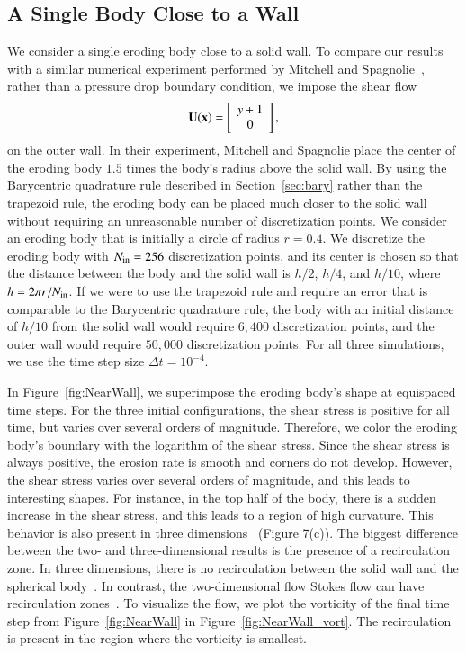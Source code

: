 \documentclass[preprint, 10pt]{elsarticle}
\begin{document}
\subsection{A Single Body Close to a Wall}
We consider a single eroding body close to a solid wall.  To compare our
results with a similar numerical experiment performed by Mitchell and
Spagnolie~\cite{mit-spa2017}, rather than a pressure drop boundary
condition, we impose the shear flow
\begin{align}
  {\mathbf{U}}({\mathbf{x}})=\left[
  \begin{array}{c}
    y+1 \\ 0
  \end{array}
  \right],
\end{align}
on the outer wall.  In their experiment, Mitchell and Spagnolie place
the center of the eroding body $1.5$ times the body's radius above the
solid wall.  By using the Barycentric quadrature rule described in
Section~\ref{sec:bary} rather than the trapezoid rule, the eroding body
can be placed much closer to the solid wall without requiring an
unreasonable number of discretization points.  We consider an eroding
body that is initially a circle of radius $r=0.4$.  We discretize the
eroding body with $N_{\mathrm{in}}=256$ discretization points, and its center is
chosen so that the distance between the body and the solid wall is
$h/2$, $h/4$, and $h/10$, where $h = 2\pi r/N_{\mathrm{in}}$.  If we were to use
the trapezoid rule and require an error that is comparable to the
Barycentric quadrature rule, the body with an initial distance of $h/10$
from the solid wall would require $6,400$ discretization points, and the
outer wall would require $50,000$ discretization points.  For all three
simulations, we use the time step size $\Delta t=10^{-4}$.

In Figure~\ref{fig:NearWall}, we superimpose the eroding body's shape at
equispaced time steps.  For the three initial configurations, the shear
stress is positive for all time, but varies over several orders of
magnitude.  Therefore, we color the eroding body's boundary with the
logarithm of the shear stress.  Since the shear stress is always
positive, the erosion rate is smooth and corners do not develop.
However, the shear stress varies over several orders of magnitude, and
this leads to interesting shapes.  For instance, in the top half of the
body, there is a sudden increase in the shear stress, and this leads to
a region of high curvature.  This behavior is also present in three
dimensions~\cite{mit-spa2017} (Figure 7(c)).  The biggest difference
between the two- and three-dimensional results is the presence of a
recirculation zone.  In three dimensions, there is no recirculation
between the solid wall and the spherical body~\cite{cha-feu2003}.  In
contrast, the two-dimensional flow Stokes flow can have recirculation
zones~\cite{chw-wu1975, hig1985}. To visualize the flow, we plot the
vorticity of the final time step from Figure~\ref{fig:NearWall} in
Figure~\ref{fig:NearWall_vort}.  The recirculation is present in the
region where the vorticity is smallest.
\end{document}
